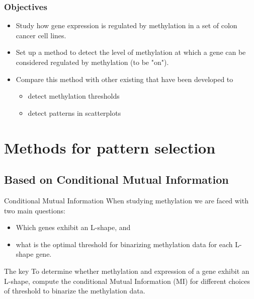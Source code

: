 \documentclass[handout]{beamer}
\begin{document}
\begin{frame}[fragile]\frametitle{Objectives}
\begin{itemize}
\item Study how gene expression is regulated by methylation in a set of colon cancer cell lines.\\
\item Set up a method to detect the level of methylation at which a gene can be considered regulated by methylation (to be "on").\\
\item Compare this method with other existing that have been developed to\\
\begin{itemize}
\item detect methylation thresholds
\item detect patterns in scatterplots
\end{itemize} 
\end{itemize} 
\end{frame}



\section{Methods for pattern selection}

\subsection{Based on Conditional Mutual Information}

\begin{frame}{Conditional Mutual Information}
When studying methylation we are faced with two main questions:
  \begin{itemize}
  \item Which genes exhibit an L-shape, and 
  \item what is the optimal threshold for binarizing
methylation data for each L-shape gene.
  \end{itemize}
\begin{block}{The key}
To determine whether methylation and expression of a gene exhibit an L-shape,
compute the conditional Mutual Information (MI) for different choices of threshold
to binarize the methylation data.
\end{block}
\end{frame}
\end{document}
